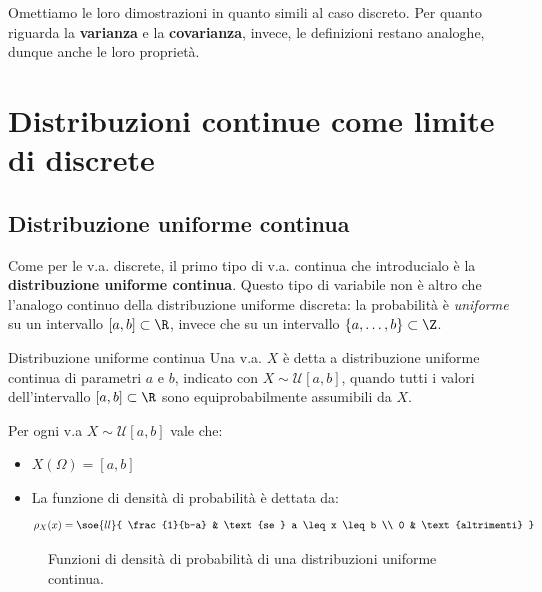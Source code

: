 \documentclass[a4paper, 12pt]{report}
\begin{document}
    Omettiamo le loro dimostrazioni in quanto simili al caso discreto. Per quanto riguarda la \textbf{varianza} e la \textbf{covarianza}, invece, le definizioni restano analoghe, dunque anche le loro proprietà.
    
    \section{Distribuzioni continue come limite di discrete}

    \subsection{Distribuzione uniforme continua}

    Come per le v.a. discrete, il primo tipo di v.a. continua che introducialo è la \textbf{distribuzione uniforme continua}. Questo tipo di variabile non è altro che l'analogo continuo della distribuzione uniforme discreta: la probabilità è \textit{uniforme} su un intervallo $[a,b] \subset \R$, invece che su un intervallo $\{a, \ldots, b\} \subset \Z$.
    
    \begin{frameddefn}{Distribuzione uniforme continua}
        Una v.a. $X$ è detta a distribuzione uniforme continua di parametri $a$ e $b$, indicato con $X \sim \mathcal{U}[a,b]$, quando tutti i valori dell'intervallo $[a,b] \subset \R$ sono equiprobabilmente assumibili da $X$.

        Per ogni v.a $X \sim \mathcal{U}[a,b]$ vale che:
        \begin{itemize}
            \item $X(\Omega) = [a,b]$
            \item La funzione di densità di probabilità è dettata da:
            \[\rho_X(x) = \soe{ll}{
                \frac{1}{b-a} & \text{se } a \leq x \leq b \\
                0 & \text{altrimenti}
            }\]
        \end{itemize}
    \end{frameddefn}

    \begin{figure}[H]
        \centering

        \caption{Funzioni di densità di probabilità di una distribuzioni uniforme continua.}
    \end{figure}
\end{document}
